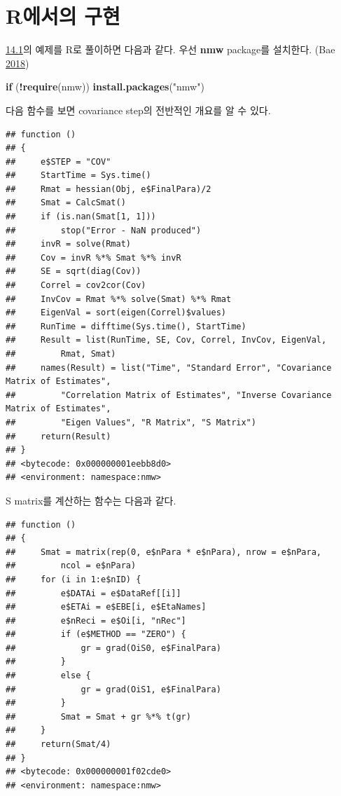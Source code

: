 \documentclass[
  10pt,
  krantz2,
  a4paper]{krantz}
\newenvironment{Shaded}{\begin{snugshade}}{\end{snugshade}}
\newcommand{\ControlFlowTok}[1]{\textcolor[rgb]{0.13,0.29,0.53}{\textbf{#1}}}
\newcommand{\KeywordTok}[1]{\textcolor[rgb]{0.13,0.29,0.53}{\textbf{#1}}}
\newcommand{\NormalTok}[1]{#1}
\newcommand{\OperatorTok}[1]{\textcolor[rgb]{0.81,0.36,0.00}{\textbf{#1}}}
\newcommand{\StringTok}[1]{\textcolor[rgb]{0.31,0.60,0.02}{#1}}
\theoremstyle{definition}
\theoremstyle{definition}
\theoremstyle{definition}
\theoremstyle{remark}
\begin{document}
\hypertarget{ruxc5d0uxc11cuxc758-uxad6cuxd604}{%
\section{R에서의 구현}\label{ruxc5d0uxc11cuxc758-uxad6cuxd604}}

\protect\hyperlink{actual-example}{14.1}의 예제를 R로 풀이하면 다음과 같다. 우선 \textbf{nmw} package를 설치한다. (Bae \protect\hyperlink{ref-R-nmw}{2018})

\begin{Shaded}
\begin{Highlighting}[]
\ControlFlowTok{if}\NormalTok{ (}\OperatorTok{!}\KeywordTok{require}\NormalTok{(nmw)) }\KeywordTok{install.packages}\NormalTok{(}\StringTok{"nmw"}\NormalTok{)}
\end{Highlighting}
\end{Shaded}

다음 함수를 보면 covariance step의 전반적인 개요를 알 수 있다.

\begin{verbatim}
## function () 
## {
##     e$STEP = "COV"
##     StartTime = Sys.time()
##     Rmat = hessian(Obj, e$FinalPara)/2
##     Smat = CalcSmat()
##     if (is.nan(Smat[1, 1])) 
##         stop("Error - NaN produced")
##     invR = solve(Rmat)
##     Cov = invR %*% Smat %*% invR
##     SE = sqrt(diag(Cov))
##     Correl = cov2cor(Cov)
##     InvCov = Rmat %*% solve(Smat) %*% Rmat
##     EigenVal = sort(eigen(Correl)$values)
##     RunTime = difftime(Sys.time(), StartTime)
##     Result = list(RunTime, SE, Cov, Correl, InvCov, EigenVal, 
##         Rmat, Smat)
##     names(Result) = list("Time", "Standard Error", "Covariance Matrix of Estimates", 
##         "Correlation Matrix of Estimates", "Inverse Covariance Matrix of Estimates", 
##         "Eigen Values", "R Matrix", "S Matrix")
##     return(Result)
## }
## <bytecode: 0x000000001eebb8d0>
## <environment: namespace:nmw>
\end{verbatim}

S matrix를 계산하는 함수는 다음과 같다.

\begin{verbatim}
## function () 
## {
##     Smat = matrix(rep(0, e$nPara * e$nPara), nrow = e$nPara, 
##         ncol = e$nPara)
##     for (i in 1:e$nID) {
##         e$DATAi = e$DataRef[[i]]
##         e$ETAi = e$EBE[i, e$EtaNames]
##         e$nReci = e$Oi[i, "nRec"]
##         if (e$METHOD == "ZERO") {
##             gr = grad(OiS0, e$FinalPara)
##         }
##         else {
##             gr = grad(OiS1, e$FinalPara)
##         }
##         Smat = Smat + gr %*% t(gr)
##     }
##     return(Smat/4)
## }
## <bytecode: 0x000000001f02cde0>
## <environment: namespace:nmw>
\end{verbatim}
\end{document}
